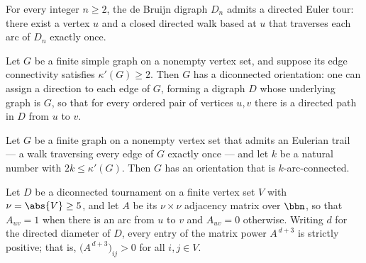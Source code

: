 \begin{theorem}
\label{deBruijnDigraph_exists_directedEulerTour}
For every integer $n \ge 2$, the de Bruijn digraph $D_n$ admits a directed Euler tour:
there exist a vertex $u$ and a closed directed walk based at $u$ that traverses each arc
of $D_n$ exactly once.
\end{theorem}

\begin{theorem}
\label{robbins_orientation}
\leanok
{}
Let $G$ be a finite simple graph on a nonempty vertex set, and suppose its edge
connectivity satisfies $\kappa'(G) \ge 2$. Then $G$ has a diconnected orientation: one
can assign a direction to each edge of $G$, forming a digraph $D$ whose underlying graph
is $G$, so that for every ordered pair of vertices $u, v$ there is a directed path in
$D$ from $u$ to $v$.
\end{theorem}

\begin{theorem}
\label{exists_kArcConnected_orientation_of_eulerian}
\leanok
{}
Let $G$ be a finite graph on a nonempty vertex set that admits an Eulerian trail — a
walk traversing every edge of $G$ exactly once — and let $k$ be a natural number with
$2k \le \kappa'(G)$. Then $G$ has an orientation that is $k$-arc-connected.
\end{theorem}

\begin{theorem}
\label{tournament_adjMatrix_pow_pos}
\leanok
{}
Let $D$ be a diconnected tournament on a finite vertex set $V$ with $\nu = \abs{V} \ge
5$, and let $A$ be its $\nu \times \nu$ adjacency matrix over $\bbn$, so that $A_{uv} =
1$ when there is an arc from $u$ to $v$ and $A_{uv} = 0$ otherwise. Writing $d$ for the
directed diameter of $D$, every entry of the matrix power $A^{\,d+3}$ is strictly
positive; that is, $\bigl(A^{\,d+3}\bigr)_{ij} > 0$ for all $i, j \in V$.
\end{theorem}

